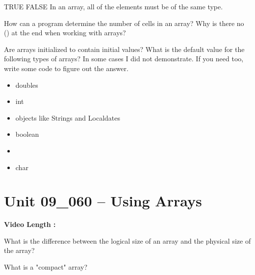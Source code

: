 \documentclass[letterpaper,12pt]{exam}
\newcommand{\unit}{Unit 09}
\begin{document}
\begin{questions}
\begin{samepage}
    \question TRUE  FALSE  In an array, all of the elements must be of the same type.
    \vspace{5mm}
\end{samepage}

\begin{samepage}
    \question How can a program determine the number of cells in an array?  Why is there no () at the end when working with arrays?
    \vspace{5mm}
\end{samepage}

\clearpage
\begin{samepage}
    \question Are arrays initialized to contain initial values?  What is the default value for the following types of arrays?  In some cases I did not demonstrate.  If you need too, write some code to figure out the answer.
    
    \begin{itemize}
        \item doubles
        \vspace{5mm}
        \item int
        \vspace{5mm}
        \item objects like Strings and Localdates
        \vspace{5mm}
        \item boolean
        \item \vspace{5mm}
        \item char
        \vspace{5mm}
    \end{itemize}
    
\end{samepage}

\section*{\unit\_060 -- Using Arrays} 
\par{\selectfont\textbf{Video Length :}}
\begin{samepage}
    \question What is the difference between the logical size of an array and the physical size of the array?
    \vspace{5mm}
\end{samepage}

\begin{samepage}
    \question What is a "compact" array?
    \vspace{5mm}
\end{samepage}


\end{questions}
\end{document}
